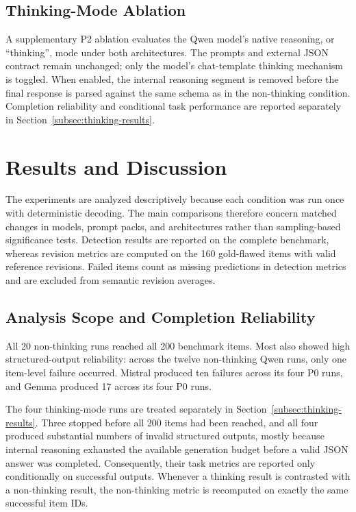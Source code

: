 \documentclass[11pt,a4paper]{article}
\begin{document}
\subsection{Thinking-Mode Ablation}
\label{subsec:thinking-method}

A supplementary P2 ablation evaluates the Qwen model's native reasoning, or
``thinking'', mode under both architectures. The prompts and external JSON
contract remain unchanged; only the model's chat-template thinking mechanism is
toggled. When enabled, the internal reasoning segment is removed before the
final response is parsed against the same schema as in the non-thinking
condition. Completion reliability and conditional task performance are reported
separately in Section~\ref{subsec:thinking-results}.


\section{Results and Discussion}
\label{sec:results}
\label{sec:discussion}

The experiments are analyzed descriptively because each condition was run once
with deterministic decoding. The main comparisons therefore concern matched
changes in models, prompt packs, and architectures rather than sampling-based
significance tests. Detection results are reported on the complete benchmark,
whereas revision metrics are computed on the 160 gold-flawed items with valid
reference revisions. Failed items count as missing predictions in detection
metrics and are excluded from semantic revision averages.


\subsection{Analysis Scope and Completion Reliability}
\label{subsec:analysis-scope}

All 20 non-thinking runs reached all 200 benchmark items. Most also showed high
structured-output reliability: across the twelve non-thinking Qwen runs, only one
item-level failure occurred. Mistral produced ten failures across its four P0
runs, and Gemma produced 17 across its four P0 runs. 

The four thinking-mode runs are treated separately in
Section~\ref{subsec:thinking-results}. Three stopped before all 200 items had
been reached, and all four produced substantial numbers of invalid structured
outputs, mostly because internal reasoning exhausted the available generation
budget before a valid JSON answer was completed. Consequently, their task
metrics are reported only conditionally on successful outputs. Whenever a
thinking result is contrasted with a non-thinking result, the non-thinking
metric is recomputed on exactly the same successful item IDs.
\end{document}
